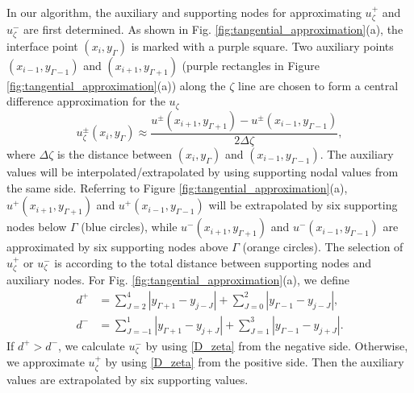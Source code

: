 \documentclass[dissertation]{uathesis}
\begin{document}
\begin{body}
\begin{flushleft}
In our algorithm, the auxiliary and supporting nodes for approximating $u^{+}_{\zeta}$ and $u^{-}_{\zeta}$ are first determined. As shown in Fig. \ref{fig:tangential_approximation}(a), the interface point $(x_i,y_{\Gamma})$ is marked with a purple square. Two auxiliary points$(x_{i-1},y_{\Gamma-1})$ and $(x_{i+1},y_{\Gamma+1})$ (purple rectangles in Figure \ref{fig:tangential_approximation}(a)) along the $\zeta$ line are chosen to form a central difference approximation for the $u_{\zeta}$
\begin{equation}\label{D_zeta}
u^{\pm}_{\zeta} (x_i,y_{\Gamma})\approx \frac{u^{\pm}(x_{i+1},y_{\Gamma+1}) - u^{\pm}(x_{i-1},y_{\Gamma-1})}{2 \Delta \zeta}, 
\end{equation}
where $\Delta \zeta$ is the distance between $(x_i,y_{\Gamma})$ and $(x_{i-1},y_{\Gamma-1})$. The auxiliary values will be interpolated/extrapolated by using supporting nodal values from the same side. 
Referring to Figure \ref{fig:tangential_approximation}(a), $u^{+}(x_{i+1},y_{\Gamma+1})$ and $u^{+}(x_{i-1},y_{\Gamma-1})$ will be extrapolated by six supporting nodes below $\Gamma$ (blue circles), while $u^{-}(x_{i+1},y_{\Gamma+1})$ and $u^{-}(x_{i-1},y_{\Gamma-1})$ are approximated by six  supporting nodes above $\Gamma$ (orange circles). The selection of $u^{+}_{\zeta}$ or $u^{-}_{\zeta}$ is according to the total distance between supporting nodes and auxiliary nodes. For Fig. \ref{fig:tangential_approximation}(a), we define
\begin{align}
d^+ & =\sum_{J=2}^4 |y_{\Gamma+1}-y_{j-J}| 
+\sum_{J=0}^2 |y_{\Gamma-1}-y_{j-J}|,   \\
d^- & =\sum_{J=-1}^1 |y_{\Gamma+1}-y_{j+J}| 
+\sum_{J=1}^3 |y_{\Gamma-1}-y_{j+J}|. 
\end{align}    
If $d^+ > d^-$, we calculate $u^{-}_{\zeta}$ by using \eqref{D_zeta} from the negative side. Otherwise, we approximate $u^{+}_{\zeta}$ by using \eqref{D_zeta} from the positive side. Then the auxiliary values are extrapolated by six supporting values. 



\end{flushleft}
\end{body}
\end{document}
